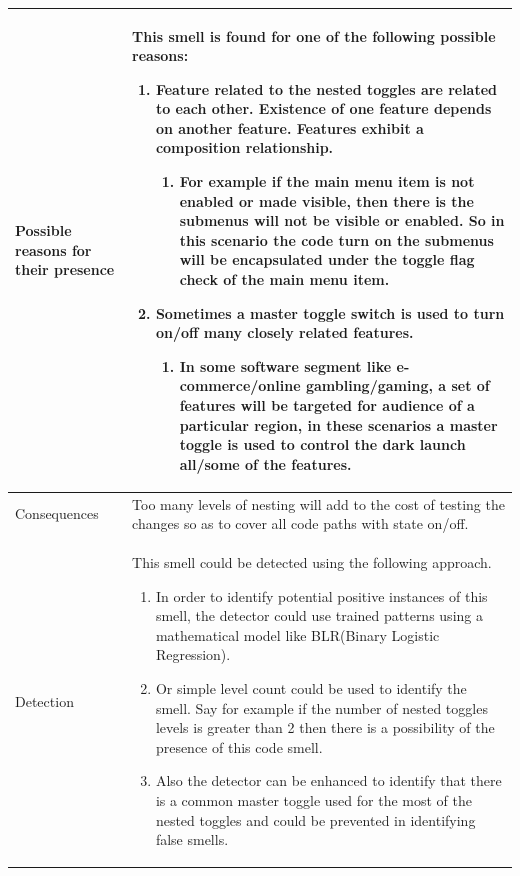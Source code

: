 \documentclass[conference]{IEEEtran}
\begin{document}
\begin{table}[!htbp]
\begin{tabular}{|p{1.5cm}|p{6.6cm}|}
 Possible reasons for their presence & This smell is found for one of the following possible reasons:
 \begin{enumerate}
 \item{Feature related to the nested toggles are related to each other. Existence of one feature depends on another feature. Features exhibit a composition relationship.
  \begin{enumerate}
  \item{For example if the main menu item is not enabled or made visible, then there is the submenus will not be visible or enabled. So in this scenario the code turn on the submenus will be encapsulated under the toggle flag check of the main menu item.}
  \end{enumerate}
 }
 \item{Sometimes a master toggle switch is used to turn on/off many closely related features.
  \begin{enumerate}
  \item{In some software segment like e-commerce/online gambling/gaming, a set of features will be targeted for audience of a particular region, in these scenarios a master toggle is used to control the dark launch all/some of the features.}
  \end{enumerate}
 }
 \end{enumerate}
 
 \\ \hline
 
 Consequences & Too many levels of nesting will add to the cost of testing the changes so as to cover all code paths with state on/off.
 \\ \hline

 Detection & This smell could be detected using the following approach.
  \begin{enumerate}
 \item{In order to identify potential positive instances of this smell, the detector could use trained patterns using a mathematical model like BLR(Binary Logistic Regression).}
 \item{Or simple level count could be used to identify the smell. Say for example if the number of nested toggles levels is greater than 2 then there is a possibility of the presence of this code smell.}
 \item{Also the detector can be enhanced to identify that there is a common master toggle used for the most of the nested toggles and could be prevented in identifying false smells.}
 \end{enumerate}

 \\ \hline
 
\end{tabular}
\label{table:toggle-nest}
\end{table}
\newpage
\end{document}
